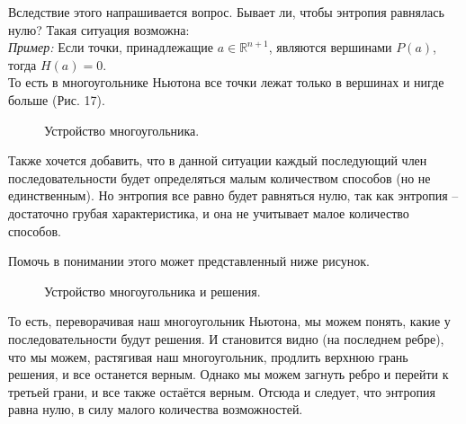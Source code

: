 \documentclass[russian]{lecture-notes}
\begin{document}
Вследствие этого напрашивается вопрос. Бывает ли, чтобы энтропия равнялась нулю? Такая ситуация возможна:\\

\emph{Пример:}
Если точки, принадлежащие $a \in \mathbb{R}^{n+1}$, являются вершинами $P(a)$, тогда $H(a) = 0$.\\

То есть в многоугольнике Ньютона все точки лежат только в вершинах и нигде больше (Рис. 17).

\begin{figure}[h]
\caption{Устройство многоугольника.}
\end{figure}

Также хочется добавить, что в данной ситуации каждый последующий член последовательности будет определяться малым количеством способов (но не единственным). Но энтропия все равно будет равняться нулю, так как энтропия -- достаточно грубая характеристика, и она не учитывает малое количество способов.

Помочь в понимании этого может представленный ниже рисунок.

\begin{figure}[h]
\caption{Устройство многоугольника и решения.}
\end{figure}

То есть, переворачивая наш многоугольник Ньютона, мы можем понять, какие у последовательности будут решения. И становится видно (на последнем ребре), что мы можем, растягивая наш многоугольник, продлить верхнюю грань решения, и все останется верным. Однако мы можем загнуть ребро и перейти к третьей грани, и все также остаётся верным. Отсюда и следует, что энтропия равна нулю, в силу малого количества возможностей.
\end{document}

